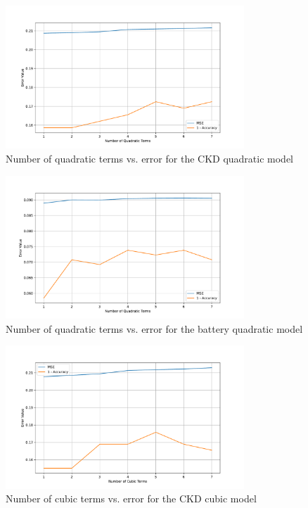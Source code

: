 \documentclass{article}
\begin{document}
\begin{figure}[H]
  \centering
  \includegraphics[width=0.8\textwidth]{quad_ckd.pdf}
  \caption{Number of quadratic terms vs. error for the CKD quadratic model}
  \label{fig:quad_ckd}
\end{figure}

\begin{figure}[H]
  \centering
  \includegraphics[width=0.8\textwidth]{quad_battery.pdf}
  \caption{Number of quadratic terms vs. error for the battery quadratic model}
  \label{fig:quad_battery}
\end{figure}

\begin{figure}[H]
  \centering
  \includegraphics[width=0.8\textwidth]{cubic_ckd.pdf}
  \caption{Number of cubic terms vs. error for the CKD cubic model}
  \label{fig:quad_ckd}
\end{figure}
\end{document}
